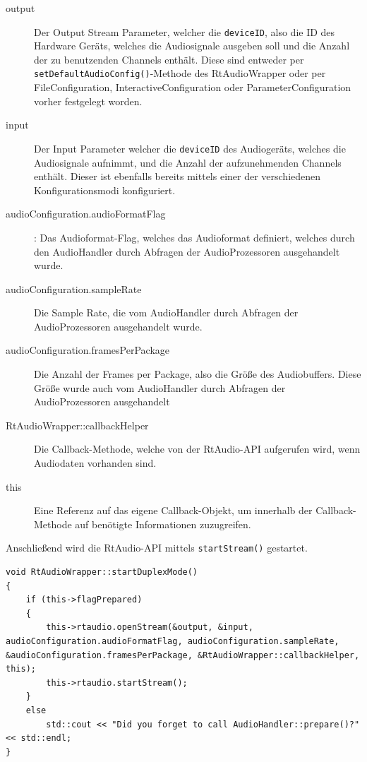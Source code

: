 \begin{description}
\item[output] Der Output Stream Parameter, welcher die \texttt{deviceID}, also die ID des Hardware Geräts, welches die Audiosignale ausgeben soll und die Anzahl der zu benutzenden Channels enthält. Diese sind entweder per \texttt{setDefaultAudio\-Config()}-Methode des RtAudioWrapper oder per FileConfiguration, InteractiveConfiguration oder ParameterConfiguration vorher festgelegt worden.
\item [input] Der Input Parameter welcher die \texttt{deviceID} des Audiogeräts, welches die Audiosignale aufnimmt, und die Anzahl der aufzunehmenden Channels enthält. Dieser ist ebenfalls bereits mittels einer der verschiedenen Konfigurationsmodi konfiguriert.
\item [audioConfiguration.audioFormatFlag] : Das Audioformat-Flag, welches das Audioformat definiert, welches durch den AudioHandler durch Abfragen der AudioProzessoren ausgehandelt wurde.
\item [audioConfiguration.sampleRate] Die Sample Rate, die vom AudioHandler durch Abfragen der AudioProzessoren ausgehandelt wurde.
\item [audioConfiguration.framesPerPackage] Die Anzahl der Frames per Package, also die Größe des Audiobuffers. Diese Größe wurde auch vom AudioHandler durch Abfragen der AudioProzessoren ausgehandelt
\item [RtAudioWrapper::callbackHelper] Die Callback-Methode, welche von der RtAudio-API aufgerufen wird, wenn Audiodaten vorhanden sind.
\item [this] Eine Referenz auf das eigene Callback-Objekt, um innerhalb der Callback-Methode auf benötigte Informationen zuzugreifen.
\end{description}

Anschließend wird die RtAudio-API mittels \texttt{startStream()} gestartet.

\begin{lstlisting}[caption={Start des Duplex Mode im RtAudioWrapper},label={Code:RtAudio}]
void RtAudioWrapper::startDuplexMode()
{
    if (this->flagPrepared)
    {
        this->rtaudio.openStream(&output, &input, audioConfiguration.audioFormatFlag, audioConfiguration.sampleRate, &audioConfiguration.framesPerPackage, &RtAudioWrapper::callbackHelper, this);
        this->rtaudio.startStream();
    }
    else
        std::cout << "Did you forget to call AudioHandler::prepare()?" << std::endl;
}
\end{lstlisting}

